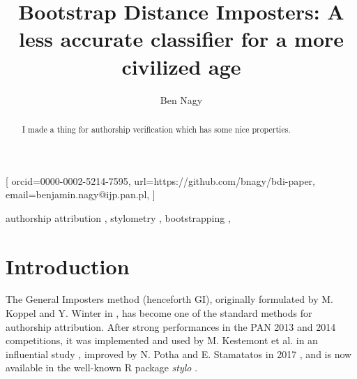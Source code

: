 \documentclass[
    hf,
]{ceurart}
\begin{document}

\conference{}
\title{Bootstrap Distance Imposters: A less accurate classifier for a more civilized age}


\author[1]{Ben Nagy}[%
    orcid=0000-0002-5214-7595,
    url=https://github.com/bnagy/bdi-paper,
    email=benjamin.nagy@ijp.pan.pl,
]
\address[1]{Institute of Polish Language, Polish Academy of Sciences (IJP PAN)\\
    Adama Mickiewicz 31\\
    Kraków, Poland}
\begin{abstract}
    I made a thing for authorship verification which has some nice properties.
\end{abstract}

\begin{keywords}
    authorship attribution \sep
    stylometry \sep
    bootstrapping \sep
\end{keywords}

\maketitle

\section{Introduction}

The General Imposters method (henceforth GI), originally formulated by M. Koppel
and Y. Winter in \cite{koppel_gi}, has become one of the standard
methods for authorship attribution. After strong performances in the PAN 2013 and
2014 competitions, it was implemented and used by M. Kestemont et al. in an
influential study \cite{kestemont_caesar}, improved by N. Potha and E.
Stamatatos in 2017 \cite{potha_improved_gi}, and is now available in the
well-known R package \emph{stylo} \cite{stylo}.
\end{document}
